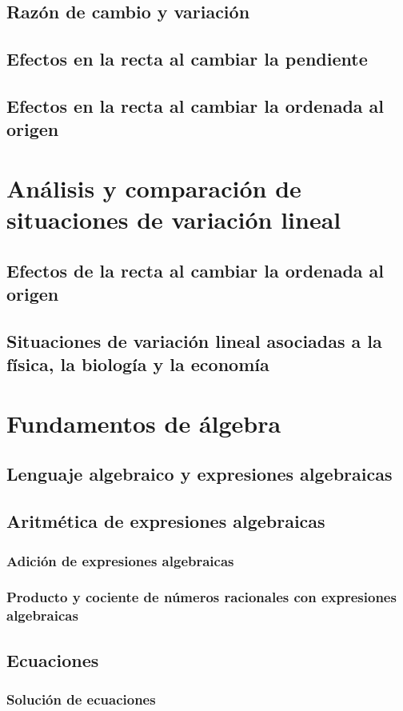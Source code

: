 \documentclass[12pt]{book}
\begin{document}
\begin{mainmatter}
    \subsection{Razón de cambio y variación}
    \subsection{Efectos en la recta al cambiar la pendiente}
    \subsection{Efectos en la recta al cambiar la ordenada al origen}

    \section{Análisis y comparación de situaciones de variación lineal}
    \subsection{Efectos de la recta al cambiar la ordenada al origen}
    \subsection{Situaciones de variación lineal asociadas a la física, la biología y la economía}


    \section{Fundamentos de álgebra}
    \subsection{Lenguaje algebraico y expresiones algebraicas}
    \subsection{Aritmética de expresiones algebraicas}
    \subsubsection{Adición de expresiones algebraicas}
    \subsubsection{Producto y cociente de números racionales con expresiones algebraicas}
    \subsection{Ecuaciones}
    \subsubsection{Solución de ecuaciones}





\end{mainmatter}
\end{document}
